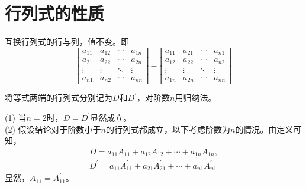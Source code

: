 \section{行列式的性质}

\begin{frame}
\begin{xingzhi}
  互换行列式的行与列，值不变。即
  \begin{equation}
    \left|
      \begin{array}{cccc}
        a_{11}  &  a_{12} & \cdots & a_{1n} \\
        a_{21}  &  a_{22} & \cdots & a_{2n} \\
        \vdots & \vdots & \ddots & \vdots\\  
        a_{n1}  &  a_{n2} & \cdots & a_{nn} 
      \end{array}
    \right|
    =
    \left|
      \begin{array}{cccc}
        a_{11}  &  a_{21} & \cdots & a_{n1} \\
        a_{12}  &  a_{22} & \cdots & a_{n2} \\
        \vdots & \vdots & \ddots & \vdots\\  
        a_{1n}  &  a_{2n} & \cdots & a_{nn} 
      \end{array}
    \right|
  \end{equation}
\end{xingzhi}
\end{frame}

\begin{frame} 
  将等式两端的行列式分别记为$D$和$D^\prime$，对阶数$n$用归纳法。\pause 
  
  \noindent(1) 当$n=2$时，$D=D^\prime$显然成立。  \\[0.1in] \pause 
  \noindent(2) 假设结论对于阶数小于$n$的行列式都成立，以下考虑阶数为$n$的情况。由定义可知，
    $$
    \begin{array}{c}
      D = a_{11} A_{11}+a_{12}A_{12}+\cdots+a_{1n}A_{1n}, \\[0.1in]
      D^\prime = a_{11} A^\prime_{11}+a_{21}A^\prime_{21}+\cdots+a_{n1}A^\prime_{n1}
    \end{array}
    $$
    显然，$A_{11}=A^\prime_{11}$。
 

\end{frame}

